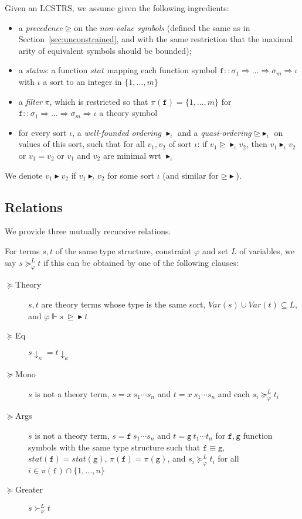 \documentclass[a4paper,USenglish,cleveref,autoref,thm-restate]{lipics-v2021}
\newcommand{\Var}{\mathit{Var}}
\newcommand{\gtvA}{L}
\newcommand{\downarrowcalc}{\downarrow_\kappa}
\newcommand{\arrtype}{\Rightarrow}
\newcommand{\geqth}{\succeq_\varphi^\gtvA}
\newcommand{\grth}{\succ_\varphi^\gtvA}
\newcommand{\geqpred}{\unrhd}
\newcommand{\eqpred}{\equiv}
\newcommand{\grsort}{\blacktriangleright}
\newcommand{\geqsort}{\unrhd\!\!\!\!\!\!\blacktriangleright}
\newcommand{\symb}[1]{\mathtt{#1}}
\newcommand{\afun}{\symb{f}}
\newcommand{\bfun}{\symb{g}}
\newcommand{\atype}{\sigma}
\newcommand{\asort}{\iota}
\newcommand{\avar}{x}
\newcommand{\status}{\mathit{stat}}
\newcommand{\filter}{\pi}
\begin{document}
Given an LCSTRS, we assume given the following ingredients:
\begin{itemize}
\item a \emph{precedence} $\geqpred$ on the \emph{non-value symbols} (defined the same as in
  Section~\ref{sec:unconstrained}, and with the same restriction that the maximal arity of
  equivalent symbols should be bounded);
\item a \emph{status}: a function $\status$ mapping each function symbol $\afun ::
  \atype_1 \arrtype \dots \arrtype \atype_m \arrtype \asort$ with $\asort$ a sort to an integer
  in $\{1,\dots,m\}$
\item a \emph{filter} $\filter$, which is restricted so that $\filter(\afun) = \{1,\dots,m\}$ for
  $\afun :: \atype_1 \arrtype \dots \arrtype \atype_m \arrtype \asort$ a theory symbol
\item for every sort $\asort$, a \emph{well-founded ordering} $\grsort_{\asort}$ and a
  \emph{quasi-ordering} $\geqsort_{\asort}$ on values of this sort, such that for all $v_1,v_2$ of
  sort $\asort$: if $v_1 \geqsort_\asort v_2$, then $v_1 \grsort_\asort v_2$ or $v_1 = v_2$ or
  $v_1$ and $v_2$ are minimal wrt $\grsort_{\asort}$
\end{itemize}
We denote $v_1 \grsort v_2$ if $v_1 \grsort_\asort v_2$ for some sort $\asort$ (and similar for
$\geqsort$).

\subsection{Relations}

We provide three mutually recursive relations.

For terms $s,t$ of the same type structure, constraint $\varphi$ and set $\gtvA$ of variables, we
say $s \geqth t$ if this can be obtained by one of the following clauses:
\begin{description}
\item[$\succeq$Theory] $s,t$ are theory terms whose type is the same sort,
  $\Var(s) \cup \Var(t) \subseteq \gtvA$,
  and $\varphi \Vdash s\ \geqsort t$
\item[$\succeq$Eq] $s\downarrowcalc = t\downarrowcalc$
\item[$\succeq$Mono] $s$ is not a theory term,
  $s = \avar\ s_1 \cdots s_n$ and $t = \avar\ s_1 \cdots s_n$ and each $s_i \geqth t_i$
\item[$\succeq$Args] $s$ is not a theory term,
  $s = \afun\ s_1 \cdots s_n$ and $t = \bfun\ t_1 \cdots t_n$ for $\afun,\bfun$
  function symbols with the same type structure such that $\afun \eqpred \bfun$,
  $\status(\afun) = \status(\bfun)$,
  $\filter(\afun) = \filter(\bfun)$, and $s_i \geqth t_i$ for all $i \in \filter(\afun) \cap
  \{1,\dots,n\}$
\item[$\succeq$Greater] $s \grth t$
\end{description}
\end{document}
